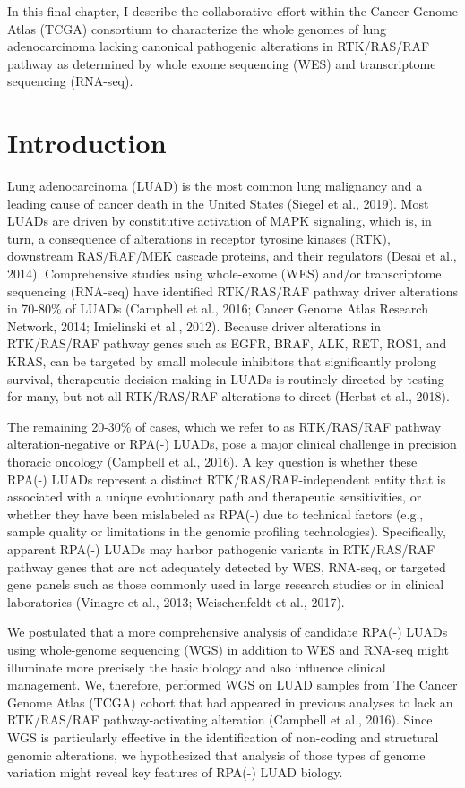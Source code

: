 \documentclass[phd,tocprelim]{cornell}
\begin{document}
In this final chapter, I describe the collaborative effort within the Cancer Genome Atlas (TCGA) consortium to characterize the whole genomes of lung adenocarcinoma lacking canonical pathogenic alterations in RTK/RAS/RAF pathway as determined by whole exome sequencing (WES) and transcriptome sequencing (RNA-seq).

\section{Introduction}
Lung adenocarcinoma (LUAD) is the most common lung malignancy and a leading cause of cancer death in the United States (Siegel et al., 2019). Most LUADs are driven by constitutive activation of MAPK signaling, which is, in turn, a consequence of alterations in receptor tyrosine kinases (RTK), downstream RAS/RAF/MEK cascade proteins, and their regulators (Desai et al., 2014). Comprehensive studies using whole-exome (WES) and/or transcriptome sequencing (RNA-seq) have identified RTK/RAS/RAF pathway driver alterations in 70-80\% of LUADs (Campbell et al., 2016; Cancer Genome Atlas Research Network, 2014; Imielinski et al., 2012). Because driver alterations in RTK/RAS/RAF pathway genes such as EGFR, BRAF, ALK, RET, ROS1, and KRAS, can be targeted by small molecule inhibitors that significantly prolong survival, therapeutic decision making in LUADs is routinely directed by testing for many, but not all RTK/RAS/RAF alterations to direct (Herbst et al., 2018).  

The remaining 20-30\% of cases, which we refer to as RTK/RAS/RAF pathway alteration-negative or RPA(-) LUADs, pose a major clinical challenge in precision thoracic oncology (Campbell et al., 2016). A key question is whether these RPA(-) LUADs represent a distinct RTK/RAS/RAF-independent entity that is associated with a unique evolutionary path and therapeutic sensitivities, or whether they have been mislabeled as RPA(-) due to technical factors (e.g., sample quality or limitations in the genomic profiling technologies). Specifically, apparent RPA(-) LUADs may harbor pathogenic variants in RTK/RAS/RAF pathway genes that are not adequately detected by WES, RNA-seq, or targeted gene panels such as those commonly used in large research studies or in clinical laboratories (Vinagre et al., 2013; Weischenfeldt et al., 2017).

We postulated that a more comprehensive analysis of candidate RPA(-) LUADs using whole-genome sequencing (WGS) in addition to WES and RNA-seq might illuminate more precisely the basic biology and also influence clinical management. We, therefore, performed WGS on LUAD samples from The Cancer Genome Atlas (TCGA) cohort that had appeared in previous analyses to lack an RTK/RAS/RAF pathway-activating alteration (Campbell et al., 2016). Since WGS is particularly effective in the identification of non-coding and structural genomic alterations, we hypothesized that analysis of those types of genome variation might reveal key features of RPA(-) LUAD biology.
\end{document}
